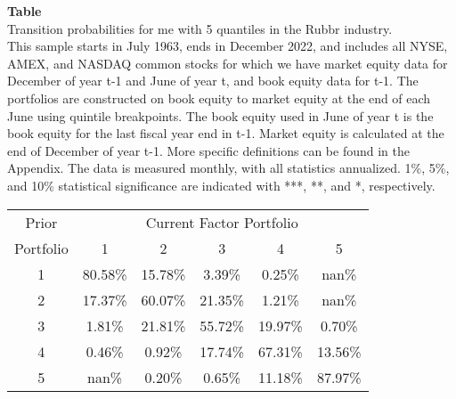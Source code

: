 \begin{table*}[ht!]
\raggedright
{}
\label{tab: transition_probs_me_Rubbr_with_5_quantiles}
\textbf{Table \thetable} \\
Transition probabilities for me with 5 quantiles in the Rubbr industry. \\
\hspace*{1em}This sample starts in July 1963, ends in December 2022, and includes all NYSE, AMEX, and NASDAQ common stocks for which we have market equity data for December of year t-1 and June of year t, and book equity data for t-1. The portfolios are constructed on book equity to market equity at the end of each June using quintile breakpoints.  The book equity used in June of year t is the book equity for the last fiscal year end in t-1.  Market equity is calculated at the end of December of year t-1.  More specific definitions can be found in the Appendix.  The data is measured monthly, with all statistics annualized.  1\%, 5\%, and 10\% statistical significance are indicated with ***, **, and *, respectively. \\
\vspace{0.5em}
\centering
\begin{adjustbox}{max width=\textwidth}
\begin{tabular}{@{}cccccc@{}}
\toprule
Prior & \multicolumn{5}{c}{Current Factor Portfolio} \\
Portfolio & 1 & 2 & 3 & 4 & 5 \\
\midrule
1 & 80.58\% & 15.78\% & 3.39\% & 0.25\% & nan\% \\
2 & 17.37\% & 60.07\% & 21.35\% & 1.21\% & nan\% \\
3 & 1.81\% & 21.81\% & 55.72\% & 19.97\% & 0.70\% \\
4 & 0.46\% & 0.92\% & 17.74\% & 67.31\% & 13.56\% \\
5 & nan\% & 0.20\% & 0.65\% & 11.18\% & 87.97\% \\
\bottomrule
\end{tabular}
\end{adjustbox}
\end{table*}
